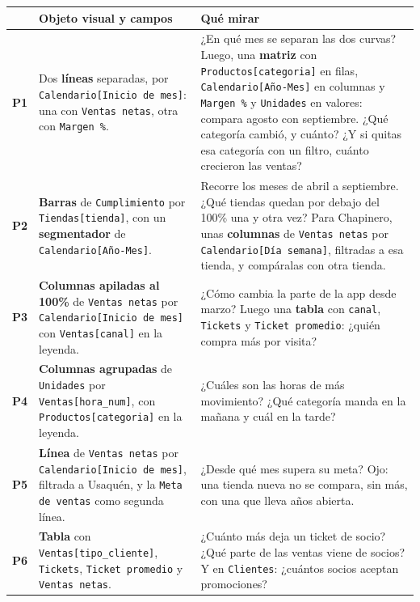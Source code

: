 \documentclass[11pt]{article}
\begin{document}
\small
\renewcommand{\arraystretch}{1.25}
\begin{tabularx}{\textwidth}{@{}>{\raggedright\arraybackslash}p{0.8cm} >{\raggedright\arraybackslash}p{4.6cm} >{\raggedright\arraybackslash}X@{}}
\toprule
& \textbf{Objeto visual y campos} & \textbf{Qué mirar}\\
\midrule
\textbf{P1} & Dos \textbf{líneas} separadas, por \texttt{Calendario[Inicio de mes]}: una con \texttt{Ventas netas}, otra con \texttt{Margen \%}. & ¿En qué mes se separan las dos curvas? Luego, una \textbf{matriz} con \texttt{Productos[categoria]} en filas, \texttt{Calendario[Año-Mes]} en columnas y \texttt{Margen \%} y \texttt{Unidades} en valores: compara agosto con septiembre. ¿Qué categoría cambió, y cuánto? ¿Y si quitas esa categoría con un filtro, cuánto crecieron las ventas?\\
\textbf{P2} & \textbf{Barras} de \texttt{Cumplimiento} por \texttt{Tiendas[tienda]}, con un \textbf{segmentador} de \texttt{Calendario[Año-Mes]}. & Recorre los meses de abril a septiembre. ¿Qué tiendas quedan por debajo del 100\% una y otra vez? Para Chapinero, unas \textbf{columnas} de \texttt{Ventas netas} por \texttt{Calendario[Día semana]}, filtradas a esa tienda, y compáralas con otra tienda.\\
\textbf{P3} & \textbf{Columnas apiladas al 100\%} de \texttt{Ventas netas} por \texttt{Calendario[Inicio de mes]} con \texttt{Ventas[canal]} en la leyenda. & ¿Cómo cambia la parte de la app desde marzo? Luego una \textbf{tabla} con \texttt{canal}, \texttt{Tickets} y \texttt{Ticket promedio}: ¿quién compra más por visita?\\
\textbf{P4} & \textbf{Columnas agrupadas} de \texttt{Unidades} por \texttt{Ventas[hora\_num]}, con \texttt{Productos[categoria]} en la leyenda. & ¿Cuáles son las horas de más movimiento? ¿Qué categoría manda en la mañana y cuál en la tarde?\\
\textbf{P5} & \textbf{Línea} de \texttt{Ventas netas} por \texttt{Calendario[Inicio de mes]}, filtrada a Usaquén, y la \texttt{Meta de ventas} como segunda línea. & ¿Desde qué mes supera su meta? Ojo: una tienda nueva no se compara, sin más, con una que lleva años abierta.\\
\textbf{P6} & \textbf{Tabla} con \texttt{Ventas[tipo\_cliente]}, \texttt{Tickets}, \texttt{Ticket promedio} y \texttt{Ventas netas}. & ¿Cuánto más deja un ticket de socio? ¿Qué parte de las ventas viene de socios? Y en \texttt{Clientes}: ¿cuántos socios aceptan promociones?\\
\bottomrule
\end{tabularx}
\renewcommand{\arraystretch}{1.0}
\normalsize
\end{document}
